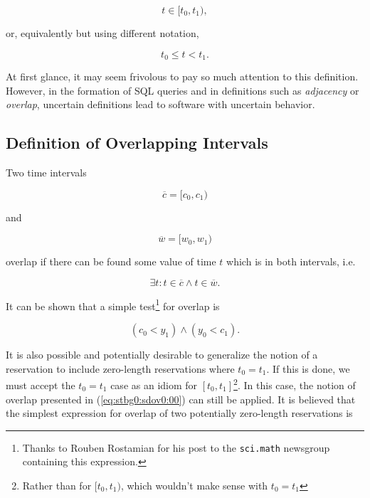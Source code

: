 \documentclass[letterpaper,10pt,titlepage]{article}
\begin{document}
\begin{equation}
t \in [ t_0, t_1),
\end{equation}

\noindent{}or, equivalently but using different notation,

\begin{equation}
t_0 \leq t < t_1 .
\end{equation}

At first glance, it may seem frivolous to pay so much attention to
this definition.  However, in the formation of SQL queries and in definitions
such as \emph{adjacency} or \emph{overlap}, uncertain definitions lead to
software with uncertain behavior.
 


\subsection{Definition of Overlapping Intervals}
\label{stbg0:sdov0}

Two time intervals

\begin{equation}
\label{eq:stbg0:sdov0:000}
\overline{c} = [c_0, c_1)
\end{equation}

\noindent{}and

\begin{equation}
\label{eq:stbg0:sdov0:0000}
\overline{w} = [w_0, w_1) 
\end{equation}

\noindent{}overlap if there can be found some value of time $t$ which
is in both intervals, i.e. 

\begin{equation}
\label{eq:stbg0:sdov0:00}
\exists t : t \in \overline{c} \wedge t \in \overline{w} .
\end{equation}

It can be shown that a simple test\footnote{Thanks to
Rouben Rostamian \cite{bibref:i:rostamianrouben}
for his post to the \texttt{sci.math} newsgroup containing this 
expression.} for
overlap is

\begin{equation}
\label{eq:stbg0:sdov0:01}
(c_0 < y_1) \wedge (y_0 < c_1) .
\end{equation}

It is also possible and potentially desirable to generalize the
notion of a reservation to include 
zero-length reservations where
$t_0 = t_1$.  If this is done, we must accept
the $t_0=t_1$ case as an idiom for $[t_0, t_1]$\footnote{Rather
than for $[t_0, t_1)$, which wouldn't make sense with $t_0=t_1$}.
In this case, the notion of overlap presented
in (\ref{eq:stbg0:sdov0:00}) can still be applied.  It is believed
that the simplest expression for overlap of two potentially 
zero-length reservations is
\end{document}
